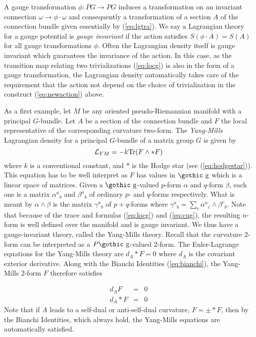 \documentclass[12pt,titlepage]{article}
\def\goth#1{\hbox{\gothic #1}}
\def\cL{{\cal L}}
\def\gg{{\goth g}}
\def\Tr{\hbox{Tr}}
\begin{document}
A gauge transformation \(\phi:PG \to PG\) induces a transformation on an
invariant connection \(\omega \to \phi\cdot \omega\) and consequently a
transformation of a section \(A\) of the connection bundle given
essentially
by (\ref{eq:lgtra}).
We say a Lagrangian theory for a gauge potential is {\em gauge
invariant\/}
%
 if the action satisfies \(S(\phi\cdot A) = S(A)\) for all
gauge transformations \(\phi\).  Often the Lagrangian density itself is
gauge invariant which guarantees the invariance of the action. In this
case, as the transition map relating two trivializations
(\ref{eq:locg})
is also in the
form of a gauge transformation, the Lagrangian density automatically
takes care of the requirement that the action not depend on the choice
of trivialization in the construct (\ref{eq:newaction}) above.



As a first example, let \(M\) be any oriented pseudo-Riemannian 
manifold with a principal
\(G\)-bundle. Let \(A\) be a section of the connection bundle and \(F
\) the local representative of
the corresponding curvature two-form. The {\em Yang-Mills\/}
%
 Lagrangian
density
for a principal \(G\)-bundle of a matrix group \(G\) is given by
\begin{equation}\label{eq:YM}%
\cL_{YM} = - k\Tr(F\wedge *F)
\end{equation}%
where \(k\) is a conventional constant, and 
\(*\) is the Hodge star (see (\ref{eq:hodgestar})). 
This equation has to be well interpret as \(F\) has values in \(\gg\)
which is a linear space of matrices. Given a \(\gg\)-valued \(p\)-form
\(\alpha\) and \(q\)-form \(\beta\), each one is a matrix
\(\alpha^a{}_b\) and \(\beta^a{}_b\) of ordinary \(p\)- and \(q\)-forms
respectively.  What is meant by \(\alpha \wedge
\beta\) is the matrix \(\gamma^a{}_b \) of \(p+q\)-forms where
\(\gamma^a{}_b= \sum_c \alpha^a{}_c\wedge\beta^c{}_b \).
Note that because of the trace and formulas (\ref{eq:locg}) and
(\ref{eq:cug}), the resulting \(n\)-form is well defined over the
manifold and is gauge invariant.
We thus have a gauge-invariant theory, called the Yang-Mills
theory.
Recall that the curvature \(2\)-form can be interpreted as a 
\(P \gg\)-valued \(2\)-form. The Euler-Lagrange equations for the 
Yang-Mills theory are \(d_A*F=0\) where \(d_A\) is the covariant
exterior derivative. Along with the Bianchi Identities (\ref{eq:bianchi}), 
the Yang-Mills
\(2\)-form \(F\) therefore satisfies

\begin{eqnarray}\label{eq:dgf}
d_A F & = & 0 \\ \label{eq:deltagf}
d_A*F & = & 0
\end{eqnarray}
Note that if \(A\) leads to a self-dual or anti-self-dual curvature,
 \(F = \pm *F\),  then by the
Bianchi Identities, which always hold,
the Yang-Mills equations are automatically satisfied.
\end{document}
